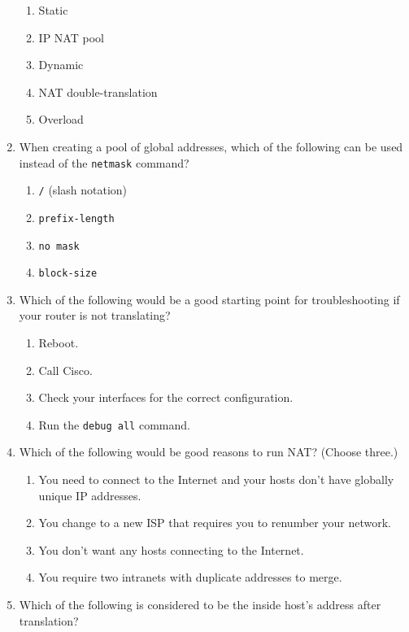 \begin{enumerate}
  \begin{enumerate}
    \item
    Static
  \item
    IP NAT pool
  \item
    Dynamic
  \item
    NAT double-translation
  \item
    Overload
  \end{enumerate}
\item
  When creating a pool of global addresses, which of the following can
  be used instead of the \texttt{netmask} command?

  \begin{enumerate}
    \item
    \texttt{/} (slash notation)
  \item
    \texttt{prefix-length}
  \item
    \texttt{no\ mask}
  \item
    \texttt{block-size}
  \end{enumerate}
\item
  Which of the following would be a good starting point for
  troubleshooting if your router is not translating?

  \begin{enumerate}
    \item
    Reboot.
  \item
    Call Cisco.
  \item
    Check your interfaces for the correct configuration.
  \item
    Run the \texttt{debug\ all} command.
  \end{enumerate}
\item
  Which of the following would be good reasons to run NAT? (Choose
  three.)

  \begin{enumerate}
    \item
    You need to connect to the Internet and your hosts don't have
    globally unique IP addresses.
  \item
    You change to a new ISP that requires you to renumber your network.
  \item
    You don't want any hosts connecting to the Internet.
  \item
    You require two intranets with duplicate addresses to merge.
  \end{enumerate}
\item
  Which of the
  following is considered to be the inside host's address after
  translation?


\end{enumerate}
